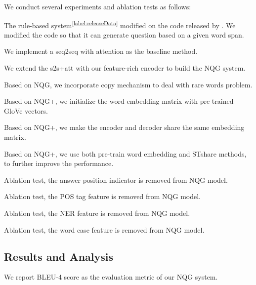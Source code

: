 \documentclass[11pt,letterpaper]{article}
\newcommand{\ourModelName}{NQG}
\begin{document}
We conduct several experiments and ablation tests as follows:
\begin{description}[noitemsep]
	\item[PCFG-Trans] The rule-based system\textsuperscript{\ref{label:releaseData}} modified on the code released by \citet{heilman2011automatic}.
	We modified the code so that it can generate question based on a given word span.
	\item[s2s+att] We implement a seq2seq with attention as the baseline method.
	\item[\ourModelName{}] We extend the s2s+att with our feature-rich encoder to build the \ourModelName{} system.
	\item[\ourModelName{}+] Based on \ourModelName{}, we incorporate copy mechanism to deal with rare words problem.
	\item[\ourModelName{}+Pretrain] Based on \ourModelName{}+, we initialize the word embedding matrix with pre-trained GloVe \citep{pennington2014glove} vectors.
\item[\ourModelName{}+STshare] Based on \ourModelName{}+, we make the encoder and decoder share the same embedding matrix.
	\item[\ourModelName{}++] Based on \ourModelName{}+, we use both pre-train word embedding and STshare methods, to further improve the performance.
	\item[\ourModelName{}Answer] Ablation test, the answer position indicator is removed from \ourModelName{} model.
	\item[\ourModelName{}POS] Ablation test, the POS tag feature is removed from \ourModelName{} model.
	\item[\ourModelName{}NER] Ablation test, the NER feature is removed from \ourModelName{} model.
	\item[\ourModelName{}Case] Ablation test, the word case feature is removed from \ourModelName{} model.
\end{description}



\subsection{Results and Analysis}

We report BLEU-4 score \cite{papineni2002bleu} as the evaluation metric of our \ourModelName{} system.
\end{document}
